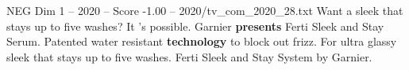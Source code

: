 \begin{textsample}{NEG Dim 1 – 2020 – Score -1.00 – 2020/tv\_com\_2020\_28.txt}  \label{ex:f1_neg_008}
Want a sleek that stays up to five washes?
It 's possible.
Garnier \textbf{presents} Ferti Sleek and Stay Serum.
Patented water resistant \textbf{technology} to block out frizz.
For ultra glassy sleek that stays up to five washes.
Ferti Sleek and Stay System by Garnier.

\end{textsample}
